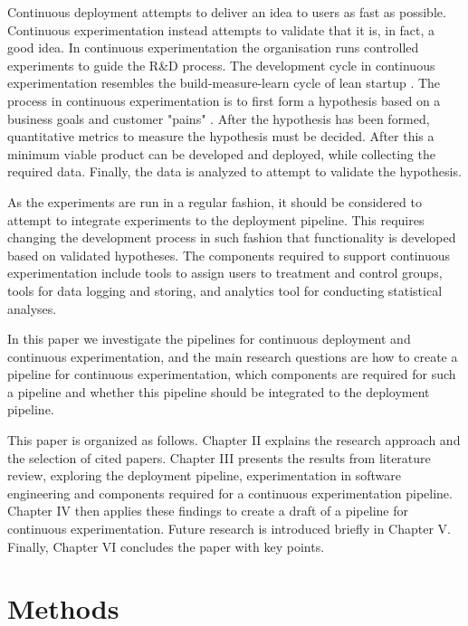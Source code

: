 \documentclass[conference]{IEEEtran}
\begin{document}
Continuous deployment attempts to deliver an idea to users as fast as possible. Continuous experimentation instead attempts to validate that it is, in fact, a good idea. In continuous experimentation the organisation runs controlled experiments to guide the R\&D process. The development cycle in continuous experimentation resembles the build-measure-learn cycle of lean startup \cite{ries2011lean}. The process in continuous experimentation is to first form a hypothesis based on a business goals and customer "pains" \cite{bosch2012building}. After the hypothesis has been formed, quantitative metrics to measure the hypothesis must be decided. After this a minimum viable product can be developed and deployed, while collecting the required data. Finally, the data is analyzed to attempt to validate the hypothesis.

As the experiments are run in a regular fashion, it should be considered to attempt to integrate experiments to the deployment pipeline. This requires changing the development process in such fashion that functionality is developed based on validated hypotheses. The components required to support continuous experimentation include tools to assign users to treatment and control groups, tools for data logging and storing, and analytics tool for conducting statistical analyses.

In this paper we investigate the pipelines for continuous deployment and continuous experimentation, and the main research questions are how to create a pipeline for continuous experimentation, which components are required for such a pipeline and whether this pipeline should be integrated to the deployment pipeline. 

This paper is organized as follows. Chapter II explains the research approach and the selection of cited papers. Chapter III presents the results from literature review, exploring the deployment pipeline, experimentation in software engineering and components required for a continuous experimentation pipeline. Chapter IV then applies these findings to create a draft of a pipeline for continuous experimentation. Future research is introduced briefly in Chapter V. Finally, Chapter VI concludes the paper with key points.

\section{Methods} %
\end{document}
